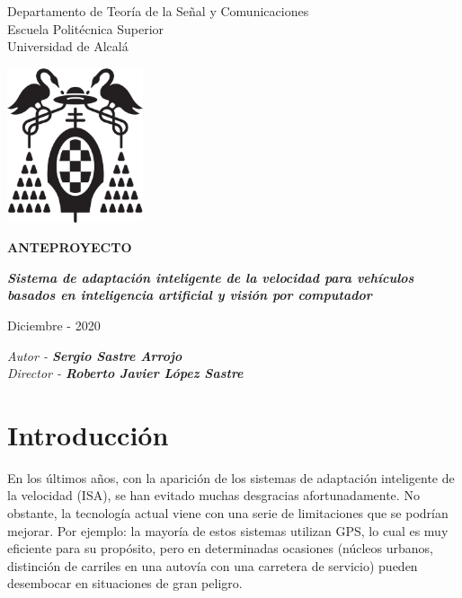\documentclass[12pt,oneside,a4paper]{article}
\begin{document}
\thispagestyle{empty}

\begin{center}


Departamento de Teoría de la Señal y Comunicaciones\\
Escuela Politécnica Superior\\
Universidad de Alcalá\\

\vspace{1cm}

\includegraphics[width=4cm]{figuras/logo-uah.eps}

\textbf{ANTEPROYECTO}

\vspace{1cm}

\begin{large}\textbf{\textit{Sistema de adaptación inteligente de la velocidad para vehículos basados en inteligencia artificial y visión por computador}}\end{large}

\vfill

Diciembre - 2020

\end{center}

\begin{flushright}
\textit{Autor - \textbf{Sergio Sastre Arrojo}} \\
\textit{Director - \textbf{Roberto Javier López Sastre}}
\end{flushright}

\newpage
\section{Introducción}

En los últimos años, con la aparición de los sistemas de adaptación inteligente de la velocidad (ISA), se han evitado muchas desgracias afortunadamente. No obstante, la tecnología actual viene con una serie de limitaciones que se podrían mejorar. Por ejemplo: la mayoría de estos sistemas utilizan GPS, lo cual es muy eficiente para su propósito, pero en determinadas ocasiones (núcleos urbanos, distinción de carriles en una autovía con una carretera de servicio) pueden desembocar en situaciones de gran peligro.
\end{document}
